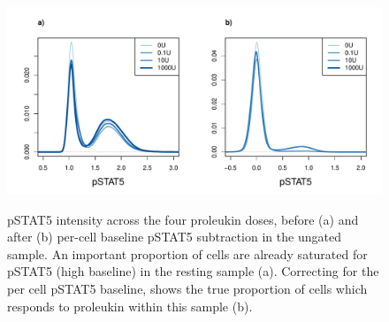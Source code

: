 \begin{figure}
\centering
\begin{minipage}{.8\textwidth}
\includegraphics[width=\linewidth]{figures/pstat5-baseline-relative}
\end{minipage}
\begin{minipage}{\textwidth}
{ pSTAT5 intensity across the four proleukin doses, before (a) and after (b) per-cell baseline pSTAT5 subtraction in the ungated sample.}
{
  An important proportion of cells are already saturated for pSTAT5 (high baseline) in the resting sample (a).
  Correcting for the per cell pSTAT5 baseline, shows the true proportion of cells which responds to proleukin within this sample (b).
}
\end{minipage}
\end{figure}


